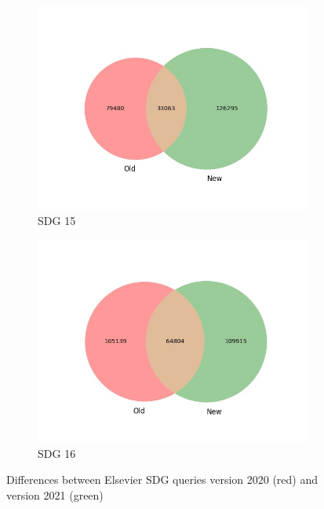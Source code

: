 \documentclass{article}
\begin{document}
\begin{figure}[H]
\begin{subfigure}{0.24\textwidth}
        \includegraphics[width=\textwidth]{figures/aurora-elsevier-venn/venn_sdg_15.jpg}
	    \caption{SDG 15}
    \end{subfigure}
    \hfill
    \begin{subfigure}{0.24\textwidth}
        \centering
        \includegraphics[width=\textwidth]{figures/aurora-elsevier-venn/venn_sdg_16.jpg}
	    \caption{SDG 16}
    \end{subfigure}
    \caption{Differences between Elsevier SDG queries version 2020 (red) and version 2021 (green)}
\end{figure}


\end{document}
